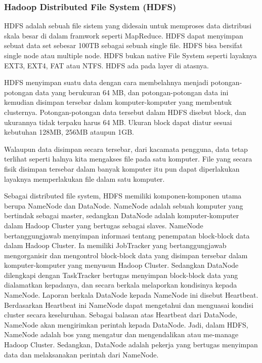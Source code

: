 \subsubsection{Hadoop Distributed File System (HDFS)}
HDFS adalah sebuah file sistem yang didesain untuk memproses data distribusi skala besar di dalam framwork seperti MapReduce. HDFS dapat menyimpan sebuat data set sebesar 100TB sebagai sebuah single file.\cite{Lam:2010:HA:1965594} HDFS bisa bersifat single node atau multiple node. HDFS bukan native File System seperti layaknya EXT3, EXT4, FAT atau NTFS. HDFS ada pada layer di atasnya.

HDFS menyimpan suatu data dengan cara membelahnya menjadi potongan-potongan data yang berukuran 64 MB, dan potongan-potongan data ini kemudian disimpan tersebar dalam komputer-komputer yang membentuk clusternya. Potongan-potongan data tersebut dalam HDFS disebut block, dan ukurannya tidak terpaku harus 64 MB. Ukuran block dapat diatur sesuai kebutuhan 128MB, 256MB ataupun 1GB.

Walaupun data disimpan secara tersebar, dari kacamata pengguna, data tetap terlihat seperti halnya kita mengakses file pada satu komputer. File yang secara fisik disimpan tersebar dalam banyak komputer itu pun dapat diperlakukan layaknya memperlakukan file dalam satu komputer.

Sebagai distributed file system, HDFS memiliki komponen-komponen utama berupa NameNode dan DataNode. NameNode adalah sebuah komputer yang bertindak sebagai master, sedangkan DataNode adalah komputer-komputer dalam Hadoop Cluster yang bertugas sebagai slaves. NameNode bertanggungjawab menyimpan informasi tentang penempatan block-block data dalam Hadoop Cluster. Ia memiliki JobTracker yang bertanggungjawab mengorganisir dan mengontrol block-block data yang disimpan tersebar dalam komputer-komputer yang menyusun Hadoop Cluster. Sedangkan DataNode dilengkapi dengan TaskTracker bertugas menyimpan block-block data yang dialamatkan kepadanya, dan secara berkala melaporkan kondisinya kepada NameNode. Laporan berkala DataNode kepada NameNode ini disebut Heartbeat. Berdasarkan Heartbeat ini NameNode dapat mengetahui dan menguasai kondisi cluster secara keseluruhan. Sebagai balasan atas Heartbeat dari DataNode, NameNode akan mengirimkan perintah kepada DataNode. Jadi, dalam HDFS, NameNode adalah bos yang mengatur dan mengendalikan atau me-manage Hadoop Cluster. Sedangkan, DataNode adalah pekerja yang bertugas menyimpan data dan melaksanakan perintah dari NameNode.

